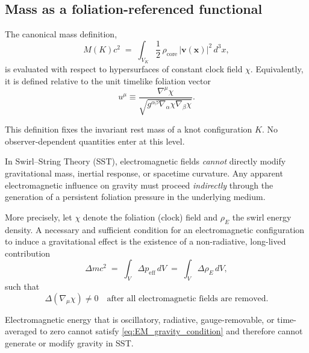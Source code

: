 \documentclass[10pt]{article}
\begin{document}
    \subsection{Mass as a foliation-referenced functional}

        The canonical mass definition,
        \begin{equation}
            M(K)c^2
            \;=\;
            \int_{V_K} \frac{1}{2}\,\rho_{\text{core}}\,|\mathbf{v}(\mathbf{x})|^2 \, d^3x ,
        \end{equation}
        is evaluated with respect to hypersurfaces of constant clock field $\chi$.
        Equivalently, it is defined relative to the unit timelike foliation vector
        \begin{equation}
            u^\mu \equiv
            \frac{\nabla^\mu \chi}{\sqrt{g^{\alpha\beta}\nabla_\alpha \chi \nabla_\beta \chi}} .
        \end{equation}

        This definition fixes the invariant rest mass of a knot configuration $K$.
        No observer-dependent quantities enter at this level.

        \begin{theorem}
            \label{thm:EM_no_gravity}

            In Swirl--String Theory (SST), electromagnetic fields \emph{cannot} directly modify
            gravitational mass, inertial response, or spacetime curvature.
            Any apparent electromagnetic influence on gravity must proceed
            \emph{indirectly} through the generation of a persistent foliation
            pressure in the underlying medium.

            More precisely, let $\chi$ denote the foliation (clock) field and
            $\rho_{\!E}$ the swirl energy density.
            A necessary and sufficient condition for an electromagnetic configuration
            to induce a gravitational effect is the existence of a non-radiative,
            long-lived contribution
            \begin{equation}
                \Delta m c^2
                \;=\;
                \int_V \Delta p_{\mathrm{eff}} \, dV
                \;=\;
                \int_V \Delta \rho_{\!E} \, dV ,
                \label{eq:EM_gravity_condition}
            \end{equation}
            such that
            \begin{equation}
                \Delta(\nabla_\mu \chi) \neq 0
                \quad\text{after all electromagnetic fields are removed.}
                \label{eq:foliation_residual}
            \end{equation}

            Electromagnetic energy that is oscillatory, radiative, gauge-removable,
            or time-averaged to zero cannot satisfy
            \eqref{eq:EM_gravity_condition} and therefore cannot generate
            or modify gravity in SST.

        \end{theorem}
\end{document}
